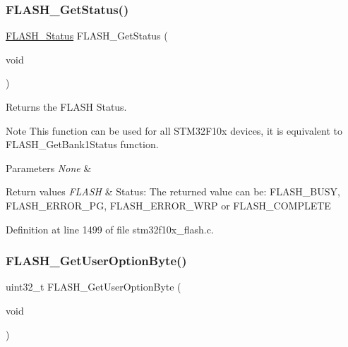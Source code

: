 \subsubsection{\texorpdfstring{F\+L\+A\+S\+H\+\_\+\+Get\+Status()}{FLASH\_GetStatus()}}
{\footnotesize\ttfamily \hyperlink{group___f_l_a_s_h___exported___types_gadc63a6f3404ff1f71229a66915e9cdc0}{F\+L\+A\+S\+H\+\_\+\+Status} F\+L\+A\+S\+H\+\_\+\+Get\+Status (\begin{DoxyParamCaption}\item[{void}]{ }\end{DoxyParamCaption})}



Returns the F\+L\+A\+SH Status. 

\begin{DoxyNote}{Note}
This function can be used for all S\+T\+M32\+F10x devices, it is equivalent to F\+L\+A\+S\+H\+\_\+\+Get\+Bank1\+Status function. 
\end{DoxyNote}

\begin{DoxyParams}{Parameters}
{\em None} & \\
\hline
\end{DoxyParams}

\begin{DoxyRetVals}{Return values}
{\em F\+L\+A\+SH} & Status\+: The returned value can be\+: F\+L\+A\+S\+H\+\_\+\+B\+U\+SY, F\+L\+A\+S\+H\+\_\+\+E\+R\+R\+O\+R\+\_\+\+PG, F\+L\+A\+S\+H\+\_\+\+E\+R\+R\+O\+R\+\_\+\+W\+RP or F\+L\+A\+S\+H\+\_\+\+C\+O\+M\+P\+L\+E\+TE \\
\hline
\end{DoxyRetVals}


Definition at line 1499 of file stm32f10x\+\_\+flash.\+c.

\mbox{\label{group___f_l_a_s_h___private___functions_ga31441647fac5fbb38369613076737943}} 
\subsubsection{\texorpdfstring{F\+L\+A\+S\+H\+\_\+\+Get\+User\+Option\+Byte()}{FLASH\_GetUserOptionByte()}}
{\footnotesize\ttfamily uint32\+\_\+t F\+L\+A\+S\+H\+\_\+\+Get\+User\+Option\+Byte (\begin{DoxyParamCaption}\item[{void}]{ }\end{DoxyParamCaption})}



